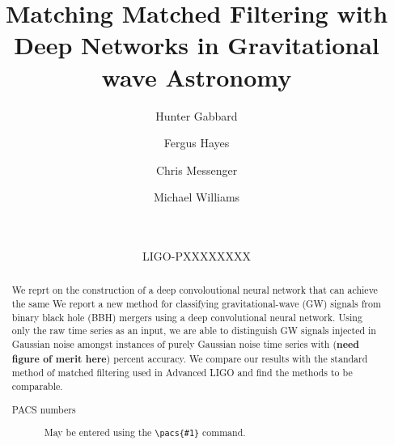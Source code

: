 \documentclass[%
 amsmath,amssymb,
 aps,
 twocolumn,
 prl,
 reprint,
floatfix,
]{revtex4-1}
\newcommand{\dcc}{LIGO-PXXXXXXXX}
\begin{document}

%
%
\title{Matching Matched Filtering with Deep Networks in Gravitational wave Astronomy}

\author{Hunter Gabbard}
\author{Fergus Hayes}
\author{Chris Messenger}
\author{Michael Williams}


\date{\commitDATE\\\mbox{\small \commitID}\\\mbox{\dcc}}

%
%
\begin{abstract} 
%
We reprt on the construction of a deep convoloutional neural network that can
achieve the same  
We report a new method for classifying gravitational-wave (GW)
signals from binary black hole (BBH) mergers using a deep convolutional neural
network. Using only the raw time series as an input, we are able to distinguish
GW signals injected in Gaussian noise amongst instances of purely Gaussian
noise time series with (\textbf{need figure of merit here}) percent accuracy.
We compare our results with the standard method of matched filtering used in
Advanced LIGO and find the methods to be comparable.  
\begin{description}
\item[PACS numbers] May be entered using the \verb+\pacs{#1}+ command.
\end{description} 
%
\end{abstract}



\maketitle
\end{document}
